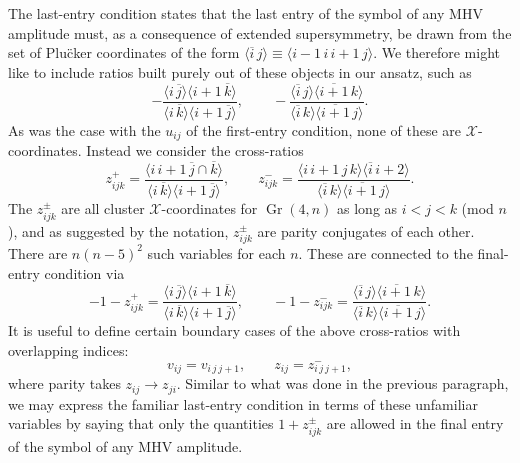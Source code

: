 \documentclass[12pt]{article}
\DeclareMathOperator{\Gr}{Gr}
\def\ket#1{\langle #1 \rangle}
\begin{document}
The last-entry condition states that the last entry of the symbol of any MHV amplitude must, as a consequence of extended supersymmetry, be drawn from the set of Plu\"cker coordinates of the form $\ket{\overline{i}\,j} \equiv \ket{i{-}1\,i\,i{+}1\,j}$.
We therefore might like to include ratios built purely out of these objects in our ansatz, such as
\begin{equation}
-\frac{\ket{i\,\overline{j}}\ket{i{+}1\,\overline{k}}}{\ket{i\,\overline{k}}\ket{i{+}1\,\overline{j}}},
\qquad -\frac{\ket{\overline{i}\,j}\ket{\overline{i{+}1}\,k}}{\ket{\overline{i}\,k}\ket{\overline{i{+}1}\,j}}.
\end{equation}
As was the case with the $u_{ij}$ of the first-entry condition, none of these are $\mathcal{X}$-coordinates. Instead we consider the cross-ratios
\begin{equation}
z^+_{ijk} =\frac{\ket{i\,i{+}1\,\overline{j}\cap\overline{k}}}{\ket{i\,\overline{k}}\ket{i{+}1\,\overline{j}}},
\qquad
z^-_{ijk}=\frac{\langle i\,i{+}1\,j\,k\rangle \langle \overline{i}\,i{+}2\rangle}{\langle \overline{i}\,k \rangle \langle \overline{i{+}1} \,j\rangle}.
\end{equation}
The $z^{\pm}_{ijk}$ are all cluster $\mathcal{X}$-coordinates for $\Gr(4,n)$ as long as $i<j<k$ (mod $n$), and as suggested by the notation, $z^\pm_{ijk}$ are parity conjugates of each other. There are $n(n-5)^2$ such variables for each $n$. These are connected to the final-entry condition via
\begin{equation}
-1-z^+_{ijk} = \frac{\ket{i\,\overline{j}}\ket{i{+}1\,\overline{k}}}{\ket{i\,\overline{k}}\ket{i{+}1\,\overline{j}}},
\qquad
-1-z^-_{ijk} = \frac{\ket{\overline{i}\,j}\ket{\overline{i{+}1}\,k}}{\ket{\overline{i}\,k}\ket{\overline{i{+}1}\,j}}.
\nonumber
\end{equation}
It is useful to define certain boundary cases of the above cross-ratios with overlapping indices:
\begin{equation}
v_{ij} = v_{i\,j\,j{+}1}, \qquad z_{ij} = z^-_{i\,j\,j{+}1},
\end{equation}
where parity takes $z_{ij}\to z_{ji}$.
Similar to what was done in the previous paragraph, we may express the familiar last-entry
condition in terms of these unfamiliar variables by saying that only the quantities $1+z_{ijk}^\pm$
are allowed in the final entry of the symbol of any MHV amplitude.
\end{document}
